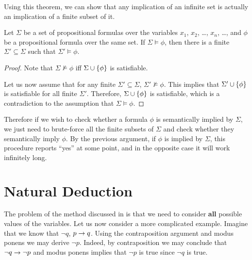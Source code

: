 Using this theorem, we can show that any implication of an infinite set is
actually an implication of a finite subset of it.
\begin{corollary}
  Let $\Sigma$ be a set of propositional formulas over the variables
  $x_1$, $x_2$, \dots, $x_n$, \dots, and $\phi$ be a propositional formula
  over the same set. If $\Sigma \models \phi$, then there is a finite
  $\Sigma' \subseteq \Sigma$ such that $\Sigma' \models \phi$.
\end{corollary}
\begin{proof}
  Note that $\Sigma \not\models \phi$ iff $\Sigma \cup \set{\phi}$ is
  satisfiable.

  Let us now assume that for any finite $\Sigma' \subseteq \Sigma$,
  $\Sigma' \not\models \phi$. This implies that $\Sigma' \cup \set{\phi}$
  is satisfiable for all finite $\Sigma'$. Therefore, $\Sigma \cup \set{\phi}$
  is satisfiable, which is a contradiction to the assumption that
  $\Sigma \models \phi$.
\end{proof}

Therefore if we wish to check whether a formula $\phi$ is semantically implied
by $\Sigma$, we just need to brute-force all the finite subsets of $\Sigma$ and
check whether they semantically imply $\phi$. By the previous argument, if
$\phi$ is implied by $\Sigma$, this procedure reports ``yes'' at some point,
and in the opposite case it will work infinitely long.

\section{Natural Deduction}


The problem of the method discussed in  is that we
need to consider \textbf{all} possible values of the variables. Let us now
consider a more complicated example. Imagine that we know that $\lnot q$,
$p \rightarrow q$. Using the contraposition argument and modus ponens we may derive
$\lnot p$. Indeed, by contraposition we may conclude that
$\lnot q \rightarrow \lnot p$ and modus ponens implies that $\lnot p$ is true since
$\lnot q$ is true.

